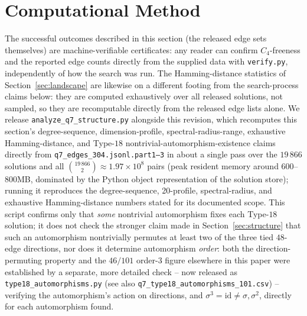 \documentclass[12pt,a4paper]{article}
\theoremstyle{definition}
\begin{document}
\section{Computational Method}\label{sec:method}

The successful outcomes described in this section (the released edge
sets themselves) are machine-verifiable certificates: any reader can
confirm $C_4$-freeness and the reported edge counts directly from the
supplied data with \texttt{verify.py}, independently of how the search
was run. The Hamming-distance statistics of Section~\ref{sec:landscape}
are likewise on a different footing from the search-process claims below:
they are computed exhaustively over all
released solutions, not sampled, so they are recomputable directly
from the released edge lists alone. We release
\texttt{analyze\_q7\_structure.py} alongside this revision, which
recomputes this section's degree-sequence, dimension-profile,
spectral-radius-range, exhaustive Hamming-distance, and Type-$18$
nontrivial-automorphism-existence claims directly from
\texttt{q7\_edges\_304.jsonl.part1--3} in about a single pass over the $19\,866$ solutions and all
$\binom{19\,866}{2}\approx1.97\times10^{8}$ pairs (peak resident memory
around $600$--$800$MB, dominated by the Python object representation of
the solution store); running it reproduces the degree-sequence, 20-profile, spectral-radius,
and exhaustive Hamming-distance numbers stated for its documented scope. This
script confirms
only that \emph{some} nontrivial automorphism fixes each Type-$18$
solution; it does not check the stronger claim made in
Section~\ref{sec:structure} that such an automorphism nontrivially
permutes at least two of the three tied $48$-edge directions, nor does
it determine automorphism \emph{order}: both the direction-permuting
property and the $46/101$ order-$3$ figure elsewhere in this paper
were established by a separate, more detailed check -- now released
as \texttt{type18\_automorphisms.py} (see also \texttt{q7\_type18\_automorphisms\_101.csv}) -- verifying the
automorphism's action on directions, and
$\sigma^3=\mathrm{id}\ne\sigma,\sigma^2$, directly for
each automorphism found.
\end{document}
